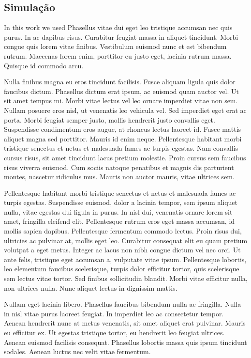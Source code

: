 \begin{btUnit}
\section{Simulação}

In this work we used Phasellus vitae dui eget leo tristique accumsan
nec quis purus. In ac dapibus risus. Curabitur feugiat massa in
aliquet tincidunt. Morbi congue quis lorem vitae finibus. Vestibulum
euismod nunc et est bibendum rutrum. Maecenas lorem enim, porttitor eu
justo eget, lacinia rutrum massa. Quisque id commodo arcu.

Nulla finibus magna eu eros tincidunt facilisis. Fusce aliquam ligula
quis dolor faucibus dictum. Phasellus dictum erat ipsum, ac euismod
quam auctor vel. Ut sit amet tempus mi. Morbi vitae lectus vel leo
ornare imperdiet vitae non sem. Nullam posuere eros nisl, ut venenatis
leo vehicula vel. Sed imperdiet eget erat ac porta. Morbi feugiat
semper justo, mollis hendrerit justo convallis eget. Suspendisse
condimentum eros augue, at rhoncus lectus laoreet id. Fusce mattis
aliquet magna sed porttitor. Mauris id enim neque. Pellentesque
habitant morbi tristique senectus et netus et malesuada fames ac
turpis egestas. Nam convallis cursus risus, sit amet tincidunt lacus
pretium molestie. Proin cursus sem faucibus risus viverra euismod. Cum
sociis natoque penatibus et magnis dis parturient montes, nascetur
ridiculus mus. Mauris non auctor mauris, vitae ultrices sem.

Pellentesque habitant morbi tristique senectus et netus et malesuada
fames ac turpis egestas. Suspendisse euismod, dolor a lacinia tempor,
sem ipsum aliquet nulla, vitae egestas dui ligula in purus. In nisl
dui, venenatis ornare lorem sit amet, fringilla eleifend elit.
Pellentesque rutrum eros eget massa accumsan, id mollis sapien
dapibus. Pellentesque fermentum commodo lectus. Proin risus dui,
ultricies ac pulvinar at, mollis eget leo. Curabitur consequat elit eu
quam pretium volutpat a eget metus. Integer ac lacus non nibh congue
dictum vel nec orci. Ut ante felis, tristique eget accumsan a,
vulputate vitae ipsum. Pellentesque lobortis, leo elementum faucibus
scelerisque, turpis dolor efficitur tortor, quis scelerisque sem
lectus vitae tortor. Sed finibus sollicitudin blandit. Morbi vitae
efficitur nulla, non ultrices nulla. Nunc aliquet lectus in dignissim
mattis.

Nullam eget lacinia libero. Phasellus faucibus bibendum nulla ac
fringilla. Nulla in nisl vitae purus laoreet feugiat. In imperdiet leo
ac consectetur tempor. Aenean hendrerit nunc at metus venenatis, sit
amet aliquet erat pulvinar. Mauris eu efficitur ex. Ut egestas
tristique tortor, eu hendrerit leo feugiat ultrices. Aenean euismod
facilisis consequat. Phasellus lobortis massa quis ipsum tincidunt
sodales. Aenean luctus nec velit vitae fermentum.


\end{btUnit}
